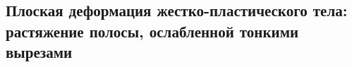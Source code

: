 

\subsection{Плоская деформация жестко-пластического тела: растяжение полосы, ослабленной тонкими вырезами}



